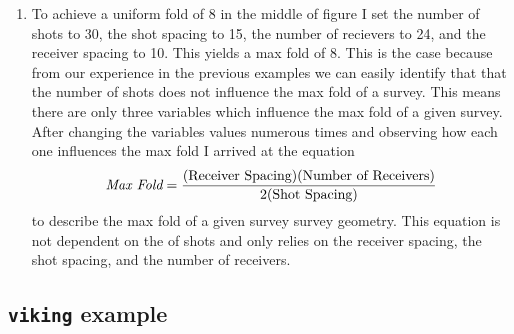 \begin{enumerate}

\item To achieve a uniform fold of 8 in the middle of figure  I set the number of shots to 30, the shot spacing to 15, the number of recievers to 24, and the receiver spacing to 10. This yields a max fold of 8. This is the case because from our experience in the previous examples we can easily identify that that the number of shots does not influence the max fold of a survey. This means there are only three variables which influence the max fold of a given survey. After changing the variables values numerous times and observing how each one influences the max fold I arrived at the equation 
\begin{align*}
\emph{Max Fold} = \frac{(\textrm{Receiver Spacing})(\textrm{Number of Receivers})}{2(\textrm{Shot Spacing})}
\end{align*}
to describe the max fold of a given survey survey geometry. This equation is not dependent on the of shots and only relies on the receiver spacing, the shot spacing, and the number of receivers.

\end{enumerate}
\pagebreak

\subsection{\texttt{viking} example}



